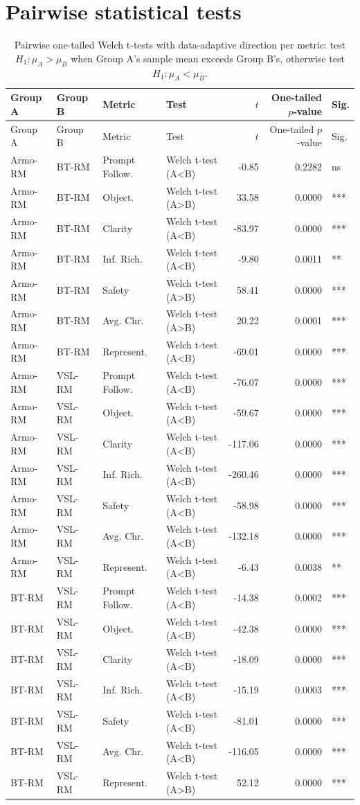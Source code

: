 \documentclass{article}
\begin{document}
\section*{Pairwise statistical tests}

\begin{longtable}{llllrrl}
\caption{Pairwise one-tailed Welch t-tests with data-adaptive direction per metric: test $H_1: \mu_{A} > \mu_{B}$ when Group A's sample mean exceeds Group B's, otherwise test $H_1: \mu_{A} < \mu_{B}$.}\label{tab:pairwise-tests}\\
\toprule
Group A & Group B & Metric & Test & $t$ & One-tailed $p$-value & Sig. \\
\midrule
\endfirsthead
\toprule
Group A & Group B & Metric & Test & $t$ & One-tailed $p$-value & Sig. \\
\midrule
\endhead
\bottomrule
\endfoot
Armo-RM & BT-RM & Prompt Follow. & Welch t-test (A<B) & -0.85 & 0.2282 & ns \\
Armo-RM & BT-RM & Object. & Welch t-test (A>B) & 33.58 & 0.0000 & *** \\
Armo-RM & BT-RM & Clarity & Welch t-test (A<B) & -83.97 & 0.0000 & *** \\
Armo-RM & BT-RM & Inf. Rich. & Welch t-test (A<B) & -9.80 & 0.0011 & ** \\
Armo-RM & BT-RM & Safety & Welch t-test (A>B) & 58.41 & 0.0000 & *** \\
Armo-RM & BT-RM & Avg. Chr. & Welch t-test (A>B) & 20.22 & 0.0001 & *** \\
Armo-RM & BT-RM & Represent. & Welch t-test (A<B) & -69.01 & 0.0000 & *** \\
Armo-RM & VSL-RM & Prompt Follow. & Welch t-test (A<B) & -76.07 & 0.0000 & *** \\
Armo-RM & VSL-RM & Object. & Welch t-test (A<B) & -59.67 & 0.0000 & *** \\
Armo-RM & VSL-RM & Clarity & Welch t-test (A<B) & -117.06 & 0.0000 & *** \\
Armo-RM & VSL-RM & Inf. Rich. & Welch t-test (A<B) & -260.46 & 0.0000 & *** \\
Armo-RM & VSL-RM & Safety & Welch t-test (A<B) & -58.98 & 0.0000 & *** \\
Armo-RM & VSL-RM & Avg. Chr. & Welch t-test (A<B) & -132.18 & 0.0000 & *** \\
Armo-RM & VSL-RM & Represent. & Welch t-test (A<B) & -6.43 & 0.0038 & ** \\
BT-RM & VSL-RM & Prompt Follow. & Welch t-test (A<B) & -14.38 & 0.0002 & *** \\
BT-RM & VSL-RM & Object. & Welch t-test (A<B) & -42.38 & 0.0000 & *** \\
BT-RM & VSL-RM & Clarity & Welch t-test (A<B) & -18.09 & 0.0000 & *** \\
BT-RM & VSL-RM & Inf. Rich. & Welch t-test (A<B) & -15.19 & 0.0003 & *** \\
BT-RM & VSL-RM & Safety & Welch t-test (A<B) & -81.01 & 0.0000 & *** \\
BT-RM & VSL-RM & Avg. Chr. & Welch t-test (A<B) & -116.05 & 0.0000 & *** \\
BT-RM & VSL-RM & Represent. & Welch t-test (A>B) & 52.12 & 0.0000 & *** \\
\end{longtable}
\end{document}
